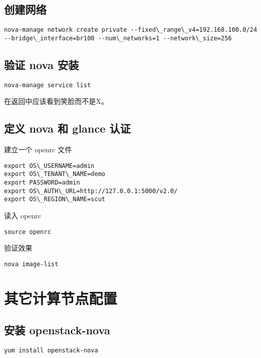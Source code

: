 \documentclass[a4paper,12pt,english]{sphinxmanual}
\begin{document}
\section{创建网络}
\label{nova:id7}
\begin{Verbatim}[commandchars=\\\{\}]
nova-manage network create private --fixed\_range\_v4=192.168.100.0/24 --bridge\_interface=br100 --num\_networks=1 --network\_size=256
\end{Verbatim}


\section{验证 nova 安装}
\label{nova:id8}
\begin{Verbatim}[commandchars=\\\{\}]
nova-manage service list
\end{Verbatim}

在返回中应该看到笑脸而不是X。


\section{定义 nova 和 glance 认证}
\label{nova:nova-glance}
建立一个 openrc 文件

\begin{Verbatim}[commandchars=\\\{\}]
export OS\_USERNAME=admin
export OS\_TENANT\_NAME=demo
export PASSWORD=admin
export OS\_AUTH\_URL=http://127.0.0.1:5000/v2.0/
export OS\_REGION\_NAME=scut
\end{Verbatim}

读入 openrc

\begin{Verbatim}[commandchars=\\\{\}]
source openrc
\end{Verbatim}

验证效果

\begin{Verbatim}[commandchars=\\\{\}]
nova image-list
\end{Verbatim}


\chapter{其它计算节点配置}
\label{nova_compute::doc}\label{nova_compute:id1}

\section{安装 openstack-nova}
\label{nova_compute:openstack-nova}
\begin{Verbatim}[commandchars=\\\{\}]
yum install openstack-nova
\end{Verbatim}
\end{document}
